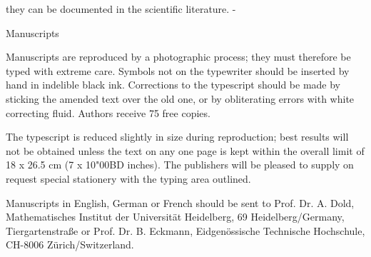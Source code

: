 {  they can be documented in the scientific literature. -\par
  \vspace{0.75em}
  {Manuscripts}\par
  \vspace{0.20em}
  Manuscripts are reproduced by a photographic process; they must therefore be
  typed with extreme care. Symbols not on the typewriter should be inserted by
  hand in indelible black ink. Corrections to the typescript should be made by
  sticking the amended text over the old one, or by obliterating errors with
  white correcting fluid. Authors receive 75 free copies.\par
  \vspace{0.75em}
  The typescript is reduced slightly in size during reproduction; best results
  will not be obtained unless the text on any one page is kept within the
  overall limit of 18 x 26.5 cm (7 x 10{\char"00BD} inches). The publishers will be
  pleased to supply on request special stationery with the typing area
  outlined.\par
  \vspace{0.75em}
  Manuscripts in English, German or French should be sent to Prof. Dr. A. Dold,
  Mathematisches Institut der Universität Heidelberg, 69 Heidelberg/Germany,
  Tiergartenstraße or Prof. Dr. B. Eckmann, Eidgenössische Technische
  Hochschule, CH-8006 Zürich/Switzerland.%
}

